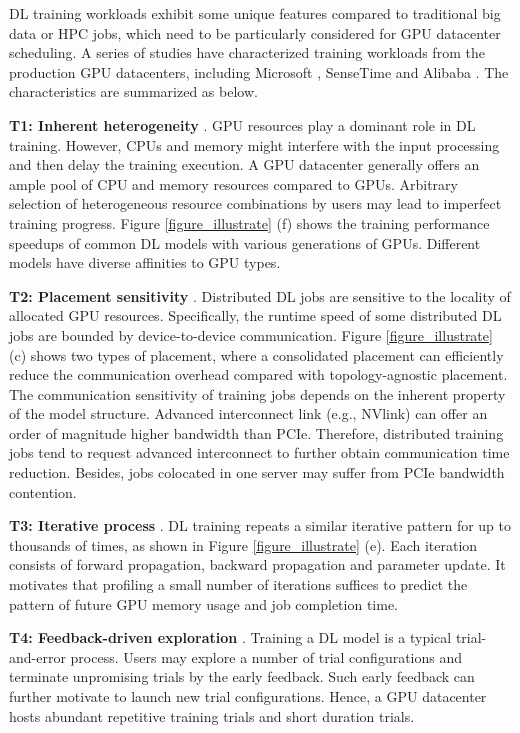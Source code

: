 DL training workloads exhibit some unique features compared to traditional big data or HPC jobs, which need to be particularly considered for GPU datacenter scheduling. A series of studies have characterized training workloads from the production GPU datacenters, including  Microsoft \cite{Philly}, SenseTime \cite{Helios} and Alibaba \cite{AliPAI, MLaaS}. The characteristics are summarized as below.

\textbf{T1: Inherent heterogeneity} \cite{Philly, Gandiva}. GPU resources play a dominant role in DL training. However, CPUs and memory might interfere with the input processing and then delay the training execution. A GPU datacenter generally offers an ample pool of CPU and memory resources compared to GPUs. Arbitrary selection of heterogeneous resource combinations by users may lead to imperfect training progress. Figure \ref{figure_illustrate} (f) shows the training performance speedups of common DL models with various generations of GPUs. Different models have diverse affinities to GPU types. 


\textbf{T2: Placement sensitivity} \cite{Gandiva,Themis}. Distributed DL jobs are sensitive to the locality of allocated GPU resources. Specifically, the runtime speed of some distributed DL jobs are bounded by device-to-device communication. Figure \ref{figure_illustrate} (c) shows two types of placement, where a consolidated placement can efficiently reduce the communication overhead compared with topology-agnostic placement. The communication sensitivity of training jobs depends on the inherent property of the model structure. Advanced interconnect link (e.g., NVlink) can offer an order of magnitude higher bandwidth than PCIe. Therefore, distributed training jobs tend to request advanced interconnect to further obtain communication time reduction. Besides, jobs colocated in one server may suffer from PCIe bandwidth contention.

\textbf{T3: Iterative process} \cite{Optimus, Chronus}. DL training repeats a similar iterative pattern for up to thousands of times, as shown in Figure \ref{figure_illustrate} (e). Each iteration consists of forward propagation, backward propagation and parameter update. It motivates that profiling a small number of iterations suffices to predict the pattern of future GPU memory usage and job completion time.

\textbf{T4: Feedback-driven exploration} \cite{Gandiva, JPAS}. Training a DL model is a typical trial-and-error process. Users may explore a number of trial configurations and terminate unpromising trials by the early feedback. Such early feedback can further motivate to launch new trial configurations. Hence, a GPU datacenter hosts abundant repetitive training trials and short duration trials.



